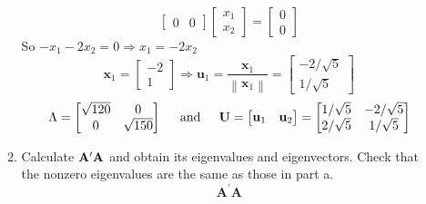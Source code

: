 \begin{enumerate}[font=\bfseries]
\begin{enumerate}
\[\begin{bmatrix}
                    0 & 0
                \end{bmatrix}
                \begin{bmatrix}
                    x_1 \\
                    x_2
                \end{bmatrix}
                =
                \begin{bmatrix}
                    0 \\
                    0
                \end{bmatrix}
            \]
            So $-x_1 - 2x_2 = 0 \Rightarrow x_1 = -2x_2$
            \[
                \mathbf{x}_1
                =
                \begin{bmatrix}
                    -2 \\
                    1
                \end{bmatrix}
                \Rightarrow
                \mathbf{u}_1
                =
                \frac{\mathbf{x}_1}{\left\|\mathbf{x}_1\right\|}
                =
                \begin{bmatrix}
                    -2/\sqrt{5} \\
                    1/\sqrt{5}
                \end{bmatrix}
            \]
            \[
                \Lambda
                =
                \begin{bmatrix}
                    \sqrt{120} & 0 \\
                    0 & \sqrt{150}
                \end{bmatrix}
                \hspace{0.2in}\text{and}\hspace{0.2in}
                \mathbf{U}
                =
                \begin{bmatrix}
                    \mathbf{u}_1 & \mathbf{u}_2
                \end{bmatrix}
                =
                \begin{bmatrix}
                    1/\sqrt{5} & -2/\sqrt{5} \\
                    2/\sqrt{5} & 1/\sqrt{5}
                \end{bmatrix}
            \]
            \item Calculate $\bold{A}^\prime\bold{A}$ and obtain its eigenvalues and eigenvectors. Check that the nonzero eigenvalues are the same as those in part a.
            \[
                \mathbf{A}^\prime\mathbf{A}
\]
\end{enumerate}
\end{enumerate}
